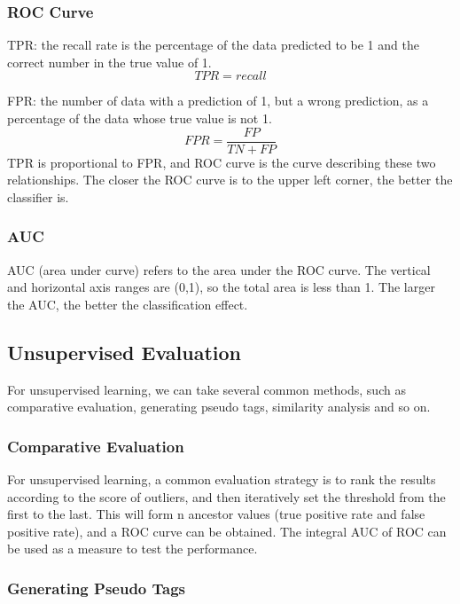 \subsubsection{ROC Curve}
TPR:
the recall rate is the percentage of the data
 predicted to be 1 and the correct number in the
 true value of 1.
 \begin{equation}
TPR=recall
 \end{equation}

FPR:
the number of data with a prediction of 1,
but a wrong prediction,
as a percentage of the data whose true value is not 1.
\begin{equation}
  FPR=\frac{FP}{TN+FP}
\end{equation}
TPR is proportional to FPR,
and ROC curve is the curve describing these two relationships.
The closer the ROC curve is to the upper left corner,
the better the classifier is.

\subsubsection{AUC}
AUC (area under curve) refers to the area under the ROC curve.
The vertical and horizontal axis ranges are (0,1),
so the total area is less than 1.
The larger the AUC,
the better the classification effect.
\subsection{Unsupervised Evaluation}

For unsupervised learning,
we can take several common methods,
such as comparative evaluation,
generating pseudo tags,
similarity analysis and so on.

\subsubsection{Comparative Evaluation}

For unsupervised learning, 
a common evaluation strategy is to rank the 
results according to the score of outliers, 
and then iteratively set the threshold from 
the first to the last. 
This will form n ancestor values 
(true positive rate and false positive rate), 
and a ROC curve can be obtained. 
The integral AUC of ROC can be used as a measure 
to test the performance.


\subsubsection{Generating Pseudo Tags}

